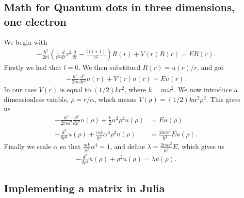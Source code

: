 \documentclass[a4paper]{article}
\begin{document}
\subsection{Math for Quantum dots in three dimensions, one electron}\label{opp d math}
We begin with 
\begin{align}
- \frac{\hbar^2}{2m} \left( \frac{1}{r^2} \frac{d}{dr} r^2 \frac{d}{dr} - \frac{l(l+1)}{r^2}\right) R(r) + V(r) R(r) = ER(r).
\end{align}
Firstly we had that $l=0$. We then substitued $R(r) = u(r)/r$, and got
\begin{align}
  -\frac{\hbar^2}{2 m} \frac{d^2}{dr^2} u(r) 
+ V(r)u(r)  = E u(r) .
\end{align}
In our case $V(r)$ is equal to $(1/2)kr^2$, where $k=m\omega^2$. We now introduce a dimensionless vaiable, $\rho = r/\alpha$, which means $V(\rho) = (1/2) k \alpha^2\rho^2$. This gives us
\begin{align}
-\frac{\hbar^2}{2 m \alpha^2} \frac{d^2}{d\rho^2} u(\rho) 
+ \frac{k}{2} \alpha^2\rho^2u(\rho)  &= E u(\rho) \\
 -\frac{d^2}{d\rho^2} u(\rho) 
+ \frac{mk}{\hbar^2} \alpha^4\rho^2u(\rho)  &= \frac{2m\alpha^2}{\hbar^2}E u(\rho) .
\end{align}
Finally we scale $\alpha$ so that $\frac{mk}{\hbar^2} \alpha^4 = 1$, and define $\lambda = \frac{2m\alpha^2}{\hbar^2}E$, which gives us
\begin{align}
  -\frac{d^2}{d\rho^2} u(\rho) + \rho^2u(\rho)  = \lambda u(\rho) .
\end{align}


\subsection{Implementing a matrix in Julia}\label{opp_d matrix}

\end{document}
